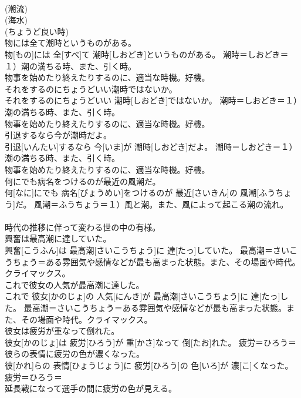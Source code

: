 \documentclass[8pt]{extreport}
\begin{document}
\begin{CJK}{UTF8}{min}
{\\	(潮流) 
\\	(海水) 
\\	(ちょうど良い時) 
\\	物には全て潮時というものがある。	
\\	物[もの]には 全[すべ]て 潮時[しおどき]というものがある。	潮時＝しおどき＝１）潮の満ちる時、また、引く時。 　　　　　　　　
\\	物事を始めたり終えたりするのに、適当な時機。好機。
\\	それをするのにちょうどいい潮時ではないか。	
\\	それをするのにちょうどいい 潮時[しおどき]ではないか。	潮時＝しおどき＝１）潮の満ちる時、また、引く時。 　　　　　　　　
\\	物事を始めたり終えたりするのに、適当な時機。好機。
\\	引退するなら今が潮時だよ。	
\\	引退[いんたい]するなら 今[いま]が 潮時[しおどき]だよ。	潮時＝しおどき＝１）潮の満ちる時、また、引く時。 　　　　　　　　
\\	物事を始めたり終えたりするのに、適当な時機。好機。
\\	何にでも病名をつけるのが最近の風潮だ。	
\\	何[なに]にでも 病名[びょうめい]をつけるのが 最近[さいきん]の 風潮[ふうちょう]だ。	風潮＝ふうちょう＝１）風と潮。また、風によって起こる潮の流れ。 　　　　　　　　　
\\	時代の推移に伴って変わる世の中の有様。
\\	興奮は最高潮に達していた。	
\\	興奮[こうふん]は 最高潮[さいこうちょう]に 達[たっ]していた。	最高潮＝さいこうちょう＝ある雰囲気や感情などが最も高まった状態。また、その場面や時代。クライマックス。
\\	これで彼女の人気が最高潮に達した。	
\\	これで 彼女[かのじょ]の 人気[にんき]が 最高潮[さいこうちょう]に 達[たっ]した。	最高潮＝さいこうちょう＝ある雰囲気や感情などが最も高まった状態。また、その場面や時代。クライマックス。
\\	彼女は疲労が重なって倒れた。	
\\	彼女[かのじょ]は 疲労[ひろう]が 重[かさ]なって 倒[たお]れた。	疲労＝ひろう＝ 
\\	彼らの表情に疲労の色が濃くなった。	
\\	彼[かれ]らの 表情[ひょうじょう]に 疲労[ひろう]の 色[いろ]が 濃[こ]くなった。	疲労＝ひろう＝ 
\\	延長戦になって選手の間に疲労の色が見える。	
}
\end{CJK}
\end{document}

